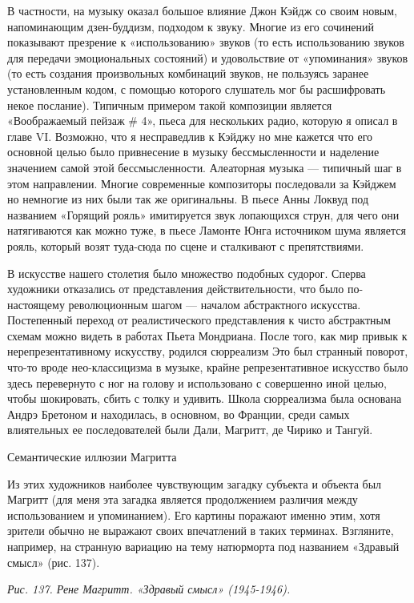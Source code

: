 \documentclass[../main.tex]{subfiles}
\begin{document}
В частности, на музыку оказал большое влияние Джон Кэйдж со своим новым, напоминающим дзен-буддизм, подходом к звуку. Многие из его сочинений показывают презрение к «использованию» звуков (то есть использованию звуков для передачи эмоциональных состояний) и удовольствие от «упоминания» звуков (то есть создания произвольных комбинаций звуков, не пользуясь заранее установленным кодом, с помощью которого слушатель мог бы расшифровать некое послание). Типичным примером такой композиции является «Воображаемый пейзаж \# 4», пьеса для нескольких радио, которую я описал в главе VI. Возможно, что я несправедлив к Кэйджу но мне кажется что его основной целью было привнесение в музыку бессмысленности и наделение значением самой этой бессмысленности. Алеаторная музыка --- типичный шаг в этом направлении. Многие современные композиторы последовали за Кэйджем но немногие из них были так же оригинальны. В пьесе Анны Локвуд под названием «Горящий рояль» имитируется звук лопающихся струн, для чего они натягиваются как можно туже, в пьесе Ламонте Юнга источником шума является рояль, который возят туда-сюда по сцене и сталкивают с препятствиями.

В искусстве нашего столетия было множество подобных судорог. Сперва художники отказались от представления действительности, что было по-настоящему революционным шагом --- началом абстрактного искусства. Постепенный переход от реалистического представления к чисто абстрактным схемам можно видеть в работах Пьета Мондриана. После того, как мир привык к нерепрезентативному искусству, родился сюрреализм Это был странный поворот, что-то вроде нео-классицизма в музыке, крайне репрезентативное искусство было здесь перевернуто с ног на голову и использовано с совершенно иной целью, чтобы шокировать, сбить с толку и удивить. Школа сюрреализма была основана Андрэ Бретоном и находилась, в основном, во Франции, среди самых влиятельных ее последователей были Дали, Магритт, де Чирико и Тангуй.

Семантические иллюзии Магритта

Из этих художников наиболее чувствующим загадку субъекта и объекта был Магритт (для меня эта загадка является продолжением различия между использованием и упоминанием). Его картины поражают именно этим, хотя зрители обычно не выражают своих впечатлений в таких терминах. Взгляните, например, на странную вариацию на тему натюрморта под названием «Здравый смысл» (рис. 137).

\emph{Рис. 137. Рене Магритт. «Здравый смысл» (1945-1946).}
\end{document}

